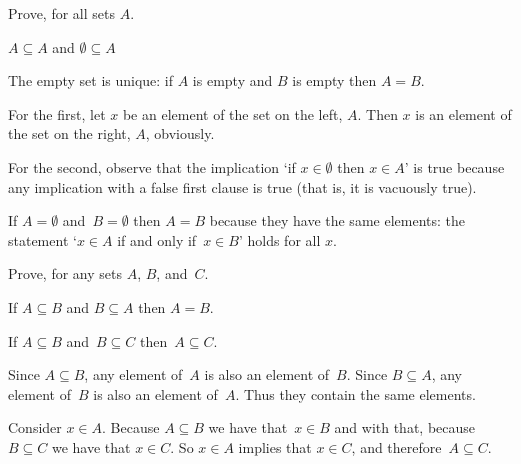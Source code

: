 \documentclass{ibl}  %
\begin{document}
\begin{ex} \label{ex:EmptySetUnique}
Prove, for all sets $A$. 
\begin{exes}
\item $A\subseteq A$ and $\emptyset\subseteq A$
\item The empty set is unique: if $A$ is empty and $B$ is empty then $A=B$.
\end{exes}
\begin{ans}
\begin{exes}
\item For the first, let $x$ be an element of the set on the left, $A$.
  Then $x$ is an element of the set on the right, $A$, obviously.

  For the second, observe that the implication 
  `if $x\in\emptyset$ then $x\in A$' is true 
  because any implication with a false first clause is true
  (that is, it is vacuously true).
\item If $A=\emptyset$ and~$B=\emptyset$ then $A=B$ because they have the
  same elements: the statement `$x\in A$ if and only if~$x\in B$' holds   
  for all $x$.
\end{exes}
\end{ans}
\end{ex}

\begin{ex}  \label{ex:PropertiesOfSubset}
Prove, for any sets $A$, $B$, and~$C$.
\begin{exes} 
\item {}
  If $A\subseteq B$ and $B\subseteq A$ then $A=B$.  
\item {}
  If $A\subseteq B$ and~$B\subseteq C$ then~$A\subseteq C$.  
\end{exes}
\begin{ans}
\begin{exes}
\item Since $A\subseteq B$, any element of~$A$ is also an element of~$B$.
   Since $B\subseteq A$, any element of~$B$ is also an element of~$A$.
   Thus they contain the same elements.
\item Consider $x\in A$.
   Because $A\subseteq B$ we have that~$x\in B$ and with that, because
   $B\subseteq C$ we have that $x\in C$.
   So $x\in A$ implies that $x\in C$, and therefore~$A\subseteq C$.
\end{exes}
\end{ans}
\end{ex}
\end{document}

